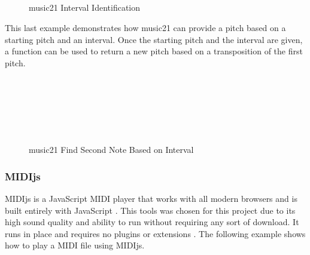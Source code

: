 \begin{figure}[!htbp]
	\caption{music21 Interval Identification \cite{Cuthbert_2020}}
	 \\
	 \\
	 \\
	 \\
	 \\
	 \\
	 \\
	 \\
	 \\
\end{figure}

This last example demonstrates how music21 can provide a pitch based on a starting pitch and an interval.  Once the starting pitch and the interval are given, a function can be used to return a new pitch based on a transposition of the first pitch.

\begin{figure}[!htbp]
	\caption{music21 Find Second Note Based on Interval \cite{Cuthbert_2020}}
	 \\
	 \\
	 \\
	 \\
	 \\
\end{figure}

\subsubsection{MIDIjs}
\label{subsubsec:midijs}

MIDIjs is a JavaScript MIDI player that works with all modern browsers and is built entirely with JavaScript \cite{MIDIjs_ND}.  This tools was chosen for this project due to its high sound quality and ability to run without requiring any sort of download.  It runs in place and requires no plugins or extensions \cite{MIDIjs_ND}.  The following example shows how to play a MIDI file using MIDIjs.

